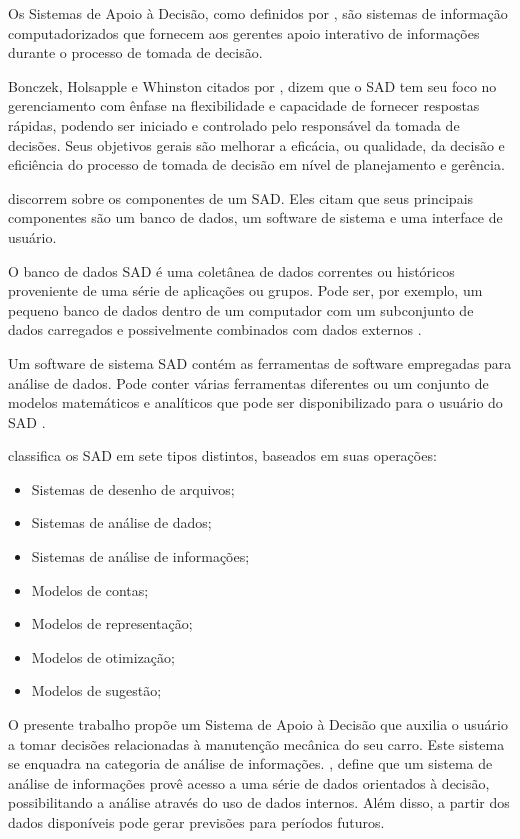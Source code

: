 \documentclass[12pt]{article}
\begin{document}
Os Sistemas de Apoio à Decisão, como definidos por ,
são sistemas de informação computadorizados que fornecem aos gerentes apoio
interativo de informações durante o processo de tomada de decisão.

Bonczek, Holsapple e Whinston citados por , dizem que
o SAD tem seu foco no gerenciamento com ênfase na flexibilidade e capacidade de
fornecer respostas rápidas, podendo ser iniciado e controlado pelo responsável
da tomada de decisões. Seus objetivos gerais são melhorar a eficácia, ou
qualidade, da decisão e eficiência do processo de tomada de decisão em nível de
planejamento e gerência.

 discorrem sobre os componentes de um SAD. Eles
citam que seus principais componentes são um banco de dados, um software de
sistema e uma interface de usuário.

O banco de dados SAD é uma coletânea de dados correntes ou históricos
proveniente de uma série de aplicações ou grupos. Pode ser, por exemplo, um
pequeno banco de dados dentro de um computador com um subconjunto de dados
carregados e possivelmente combinados com dados externos
\cite{kenneth2011sistemas}.

Um software de sistema SAD contém as ferramentas de software empregadas para
análise de dados. Pode conter várias ferramentas diferentes ou um conjunto de
modelos matemáticos e analíticos que pode ser disponibilizado para o usuário do
SAD \cite{kenneth2011sistemas}.

 classifica os SAD em sete tipos distintos,
baseados em suas operações:

\begin{itemize}
  \item Sistemas de desenho de arquivos;
  \item Sistemas de análise de dados;
  \item Sistemas de análise de informações;
  \item Modelos de contas;
  \item Modelos de representação;
  \item Modelos de otimização;
  \item Modelos de sugestão;
\end{itemize}

O presente trabalho propõe um Sistema de Apoio à Decisão que auxilia o usuário
a tomar decisões relacionadas à manutenção mecânica do seu carro. Este sistema
se enquadra na categoria de análise de informações.
, define que um sistema de análise de informações
provê acesso a uma série de dados orientados à decisão, possibilitando a análise
através do uso de dados internos. Além disso, a partir dos dados disponíveis
pode gerar previsões para períodos futuros.
\end{document}

